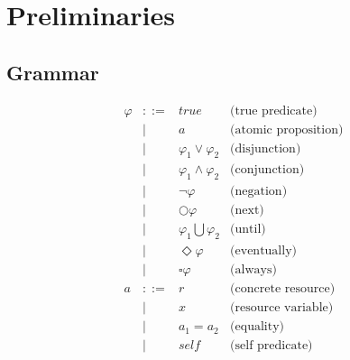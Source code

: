 \section{Preliminaries}
\subsection{Grammar}
\[
\begin{array}{rcll}
    \varphi     & ::=   & true                          & \text{(true predicate)} \\
                & |     & a                             & \text{(atomic proposition)} \\
                & |     & \varphi_1 \vee \varphi_2      & \text{(disjunction)} \\
                & |     & \varphi_1 \wedge \varphi_2    & \text{(conjunction)} \\
                & |     & \neg \varphi                  & \text{(negation)} \\
                & |     & \bigcirc \varphi              & \text{(next)} \\
                & |     & \varphi_1 \bigcup \varphi_2   & \text{(until)} \\
                & |     & \Diamond \varphi              & \text{(eventually)} \\
                & |     & \square \varphi               & \text{(always)} \\
    a           &::=    & r                             & \text{(concrete resource)} \\
                & |     & x                             & \text{(resource variable)} \\
                & |     & a_1 = a_2                     & \text{(equality)} \\
                & |     & self                          & \text{(self predicate)} \\
\end{array}
\]